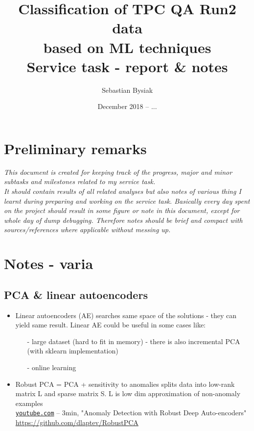 \documentclass{article}
\title{ Classification of TPC QA Run2 data \\ based on ML techniques \\
\small{Service task - report \& notes}}
\author{Sebastian Bysiak}
\date{December 2018 -- ...}
\begin{document}
\maketitle
\tableofcontents


\section{Preliminary remarks}

\textit{
This document is created for keeping track of the progress, major and minor subtasks and milestones related to my service task.\\
It should contain results of all related analyses but also notes of various thing I learnt during preparing and working on the service task.
Basically every day spent on the project should result in some figure or note in this document, except for whole day of dump debugging. 
Therefore notes should be brief and compact with sources/references where applicable without messing up.
}

\clearpage
\section{Notes - varia}

\subsection{PCA \& linear autoencoders}
\begin{itemize}
\item Linear autoencoders (AE) searches same space of the solutions - they can yield same result.
Linear AE could be useful in some cases like: 
\begin{itemize}[topsep=0pt, itemsep=-2pt]
	\item[-] large dataset (hard to fit in memory) - there is also incremental PCA (with sklearn implementation)
	\item[-] online learning 
\end{itemize}
\item Robust PCA = PCA + sensitivity to anomalies
splits data into low-rank matrix L and sparse matrix S.
L is low dim approximation of non-anomaly examples \vspace{0pt} \\
\href{https://www.youtube.com/watch?v=eFQVvFMHlC8}{\texttt{youtube.com}} -- 3min, "Anomaly Detection with Robust Deep Auto-encoders"\\
\url{https://github.com/dlaptev/RobustPCA} 
\end{itemize}
\end{document}
